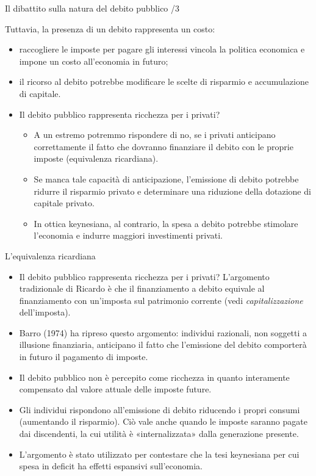 \documentclass[aspectratio=64,11pt]{beamer}
\begin{document}
\begin{frame}{Il dibattito sulla natura del debito pubblico /3}

  Tuttavia, la presenza di un debito rappresenta un costo:
  \begin{itemize}
  \item raccogliere le imposte per pagare gli interessi vincola la politica
    economica e impone un costo all'economia in futuro;
  \item il ricorso al debito potrebbe modificare le scelte di risparmio e
    accumulazione di capitale.
  \item Il debito pubblico rappresenta ricchezza per i privati?
    \begin{itemize}
    \item A un estremo potremmo rispondere di no, se i privati anticipano
      correttamente il fatto che dovranno finanziare il debito con le proprie
      imposte (equivalenza ricardiana).
    \item Se manca tale capacità di anticipazione, l'emissione di debito
      potrebbe ridurre il risparmio privato e determinare una riduzione della
      dotazione di capitale privato.
    \item In ottica keynesiana, al contrario, la spesa a debito potrebbe
      stimolare l'economia e indurre maggiori investimenti privati.
    \end{itemize}
  \end{itemize}
\end{frame}

\begin{frame}{L'equivalenza ricardiana}

  \begin{itemize}
  \item Il debito pubblico rappresenta ricchezza per i privati? L'argomento
    tradizionale di Ricardo è che il finanziamento a debito equivale al
    finanziamento con un'imposta sul patrimonio corrente (vedi
    \emph{capitalizzazione} dell'imposta).
  \item Barro (1974) ha ripreso questo argomento: individui razionali, non
    soggetti a illusione finanziaria, anticipano il fatto che l'emissione del
    debito comporterà in futuro il pagamento di imposte.
  \item Il debito pubblico non è percepito come ricchezza in quanto
    interamente compensato dal valore attuale delle imposte future.
  \item Gli individui rispondono all'emissione di debito riducendo i propri
    consumi (aumentando il risparmio). Ciò vale anche quando le imposte
    saranno pagate dai discendenti, la cui utilità è «internalizzata» dalla
    generazione presente.
  \item L'argomento è stato utilizzato per contestare che la tesi keynesiana
    per cui spesa in deficit ha effetti espansivi sull'economia.
  \end{itemize}
\end{frame}
\end{document}
